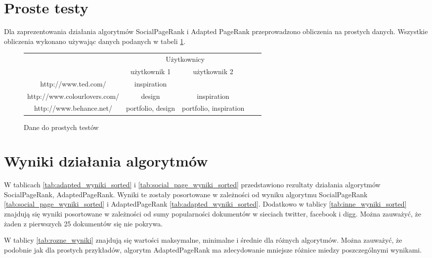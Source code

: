 \section{Proste testy}

Dla zaprezentowania działania algorytmów SocialPageRank i Adapted PageRank przeprowadzono obliczenia na prostych danych. Wszystkie obliczenia wykonano używając danych podanych w tabeli \ref{fig:test_proste_dane}. 


\begin{figure}[htb]
  \centering
  \begin{tabular}{|c|c|c|c|c|}
    \hline
    \multicolumn{1}{|c|}{}&\multicolumn{2}{c|}{Użytkownicy}\\

    \cline{2-3}
    \multicolumn{1}{|c|}{}&użytkownik 1&użytkownik 2\\
    \hline
 	http://www.ted.com/ & inspiration & \\
	http://www.colourlovers.com/&	design & inspiration \\
	http://www.behance.net/	&portfolio, design & portfolio, inspiration \\
    \hline
  \end{tabular}
  \caption{Dane do prostych testów}
  \label{fig:test_proste_dane}
\end{figure}




\section{Wyniki działania algorytmów}

W tablicach \ref{tab:adapted_wyniki_sorted} i \ref{tab:social_page_wyniki_sorted} przedstawiono rezultaty działania algorytmów SocialPageRank, AdaptedPageRank. Wyniki te zostały posortowane w zależności od wyniku algorytmu SocialPageRank \ref{tab:social_page_wyniki_sorted} i  AdaptedPageRank \ref{tab:adapted_wyniki_sorted}. Dodatkowo w tablicy \ref{tab:inne_wyniki_sorted} znajdują się wyniki posortowane w zależności od sumy popularności dokumentów w sieciach twitter, facebook i digg. Można zauważyć, że żaden z pierwszych 25 dokumentów się nie pokrywa. 

W tablicy \ref{tab:rozne_wyniki}  znajdują się wartości maksymalne, minimalne i średnie dla różnych algorytmów. Można zauważyć, że podobnie jak dla prostych przykładów, algorytm AdaptedPageRank ma zdecydowanie mniejsze różnice miedzy poszczególnymi wynikami. 


